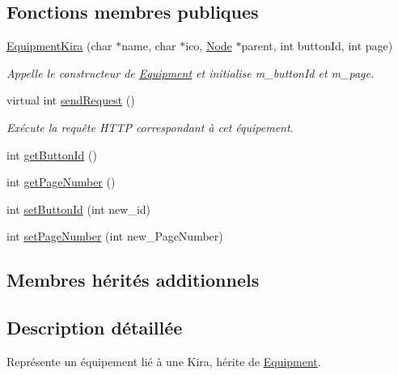 \subsection*{Fonctions membres publiques}
\begin{DoxyCompactItemize}
\item 
\hyperlink{class_e_p_1_1_equipment_kira_a7b96ccdab1a7d69e656c9602fce99213}{Equipment\+Kira} (char $\ast$name, char $\ast$ico, \hyperlink{class_e_p_1_1_node}{Node} $\ast$parent, int button\+Id, int page)
\begin{DoxyCompactList}\small\item\em Appelle le constructeur de \hyperlink{class_e_p_1_1_equipment}{Equipment} et initialise m\+\_\+button\+Id et m\+\_\+page. \end{DoxyCompactList}\item 
virtual int \hyperlink{class_e_p_1_1_equipment_kira_ad59c93de1b98996ec273c5638cd7e47a}{send\+Request} ()\hypertarget{class_e_p_1_1_equipment_kira_ad59c93de1b98996ec273c5638cd7e47a}{}\label{class_e_p_1_1_equipment_kira_ad59c93de1b98996ec273c5638cd7e47a}

\begin{DoxyCompactList}\small\item\em Exécute la requête H\+T\+TP correspondant à cet équipement. \end{DoxyCompactList}\item 
int \hyperlink{class_e_p_1_1_equipment_kira_ae2ce7a10bf38a28b5c0c8f44420c3f10}{get\+Button\+Id} ()
\item 
int \hyperlink{class_e_p_1_1_equipment_kira_a689d07be3886b6b195e9c7bb3c20986d}{get\+Page\+Number} ()
\item 
int \hyperlink{class_e_p_1_1_equipment_kira_a1e695e63e1e736d1d107079a8277db2c}{set\+Button\+Id} (int new\+\_\+id)
\item 
int \hyperlink{class_e_p_1_1_equipment_kira_a788cf486ccf2652a40f4104f27478d74}{set\+Page\+Number} (int new\+\_\+\+Page\+Number)
\end{DoxyCompactItemize}
\subsection*{Membres hérités additionnels}


\subsection{Description détaillée}
Représente un équipement lié à une Kira, hérite de \hyperlink{class_e_p_1_1_equipment}{Equipment}. 


